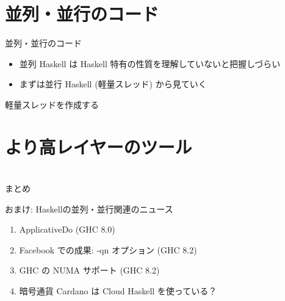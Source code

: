 \documentclass[unicode,12pt]{beamer}
\begin{document}
\section{並列・並行のコード}

\begin{frame}{並列・並行のコード}
  \begin{itemize}
  \item 並列 Haskell は Haskell 特有の性質を理解していないと把握しづらい
  \item まずは並行 Haskell (軽量スレッド) から見ていく
  \end{itemize}
\end{frame}

\begin{frame}{軽量スレッドを作成する}

\end{frame}

\section{より高レイヤーのツール}

\begin{frame}{}
\end{frame}

\section{}

\begin{frame}{まとめ}

\end{frame}

\begin{frame}{おまけ: Haskellの並列・並行関連のニュース}
  \begin{enumerate}
  \item ApplicativeDo (GHC 8.0)
  \item Facebook での成果: -qn オプション (GHC 8.2)
  \item GHC の NUMA サポート (GHC 8.2)
  \item 暗号通貨 Cardano は Cloud Haskell を使っている？
  \end{enumerate}
\end{frame}
\end{document}

